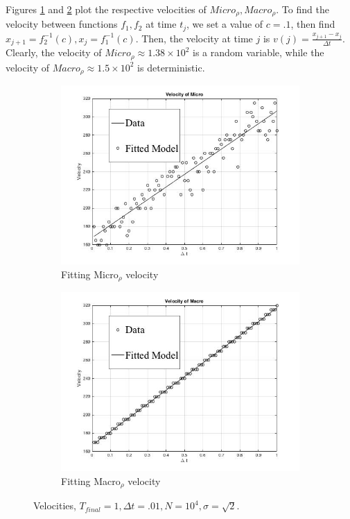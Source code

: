 \documentclass[10pt]{article}
\begin{document}
Figures \ref{fig: MicroVel} and \ref{fig: MacroVel} plot the respective velocities of $Micro_{\rho}, Macro_{\rho}$. To find the velocity between functions $f_1, f_2$ at time $t_j$, we set a value of $c = .1$, then find $x_{j+1} = f_{2}^{-1}(c),  x_{j} = f_{1}^{-1}(c)$. Then, the velocity at time $j$ is $v(j) = \frac{x_{j+1}- x_{j}}{\Delta t}$. Clearly, the velocity of $Micro_{\rho} \approx 1.38 \times 10^2$ is a random variable, while the velocity of $Macro_{\rho}\approx 1.5 \times 10^2$ is deterministic. 

\begin{figure}
\centering
\begin{subfigure}{.5\textwidth}
  \centering
  \includegraphics[width=.9\linewidth]{1DMicroVelocity.jpg}
  \caption{Fitting Micro$_{\rho}$ velocity}
  \label{fig: MicroVel}
\end{subfigure}%
\begin{subfigure}{.5\textwidth}
  \centering
  \includegraphics[width=.9\linewidth]{1DMacroVelocity.jpg}
  \caption{Fitting Macro$_{\rho}$ velocity}
  \label{fig: MacroVel}
\end{subfigure}
\caption{Velocities, $T_{final} = 1, \Delta t = .01, N = 10^4, \sigma = \sqrt{2}.$}
\label{fig:test}
\end{figure}
\end{document}
